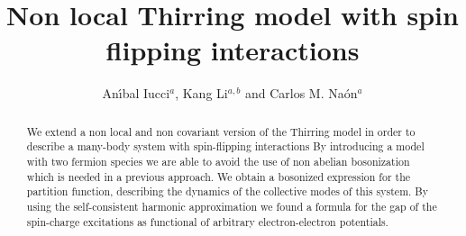 \documentclass[a4paper,a4paper]{article}
\begin{document}
\newcommand{\unmedio}{{\scriptstyle\frac{1}{2}}}
\newcommand{\eff}{_{\text{eff}}}
\newcommand{\Infinity}{\infty}
\newcommand{\flip}{_{\text{flip}}}
\newcommand{\bos}{_{0\text{B}}}
\newcommand{\bosonic}{_{\text{bos}}}
\newcommand{\ferm}{_{0\text{F}}}
\newcommand{\trial}{_{\text{trial}}}
\newcommand{\true}{_{\text{true}}}

\newcommand{\sign}{\operatorname{sign}}
\newcommand{\Ci}{\operatorname{Ci}}
\newcommand{\tr}{\operatorname{tr}}

\newcommand{\PsiB}{\bar{\Psi}}   %
\newcommand{\phiH}{\hat{\phi}}
\newcommand{\etaH}{\hat{\eta}}
\newcommand{\chiB}{\bar{\chi}}
\newcommand{\xiH}{\hat{\xi}}
\newcommand{\zetaH}{\hat{\zeta}}
\newcommand{\vH}{\hat{v}}
\newcommand{\bH}{\hat{b}}

\newcommand{\AB}{\bar{A}_\mu}
\newcommand{\BB}{\bar{B}_\mu}
\newcommand{\AT}{\tilde{A}_\mu}
\newcommand{\BT}{\tilde{B}_\mu}

\newcommand{\slp}{\raise.15ex\hbox{$/$}\kern-.57em\hbox{$\partial$}}
\newcommand{\slA}{\raise.15ex\hbox{$/$}\kern-.63em\hbox{$A$}}

\newcommand{\difp}{\frac{d^2p}{(2\pi)^2}\,}

\newcommand{\bra}{\left\langle}
\newcommand{\ket}{\right\rangle}
\newcommand{\bracket}{\left\langle\,\right\rangle}

\newcommand{\D}{\mathcal{D}}
\newcommand{\N}{\mathcal{N}}
\newcommand{\Lag}{\mathcal{L}}
\newcommand{\V}{\mathcal{V}}
\newcommand{\Z}{\mathcal{Z}}


\thispagestyle{empty}
\title{Non local Thirring model with spin flipping interactions}
\author{An\'{\i}bal Iucci$^a$,  Kang Li$^{a,b}$ and Carlos M. Na\'on$^a$}
\date{}
\maketitle

\begin{abstract}

We extend a non local and non covariant version of the Thirring model in order to
describe a many-body system with spin-flipping interactions By introducing a model
with two fermion species we are able to avoid the use of non abelian bosonization
which is needed in a previous approach. We obtain a bosonized expression for the
partition function, describing the dynamics of the collective modes of this system. By
using the self-consistent harmonic approximation we found a formula for the gap of the
spin-charge excitations as functional of arbitrary electron-electron potentials.

\end{abstract}
\end{document}
